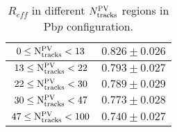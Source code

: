 \begin{table}[H]
\centering
\caption{$R_{eff}$ in different $N_{\rm tracks}^{\rm PV}$ regions in Pb$p$ configuration.}
\begin{center}
\begin{tabular}{c|c}
\hline
$0 \leq \mathrm{N_{\rm tracks}^{\rm PV}} < 13$ & $0.826 \pm 0.026$ \\
\hline
$13 \leq \mathrm{N_{\rm tracks}^{\rm PV}} < 22$ & $0.793 \pm 0.027$ \\
\hline
$22 \leq \mathrm{N_{\rm tracks}^{\rm PV}} < 30$ & $0.789 \pm 0.029$ \\
\hline
$30 \leq \mathrm{N_{\rm tracks}^{\rm PV}} < 47$ & $0.773 \pm 0.028$ \\
\hline
$47 \leq \mathrm{N_{\rm tracks}^{\rm PV}} < 100$ & $0.740 \pm 0.027$ \\
\hline
\end{tabular}
\end{center}
\label{ReffTable_NBack_Pbp}
\end{table}
